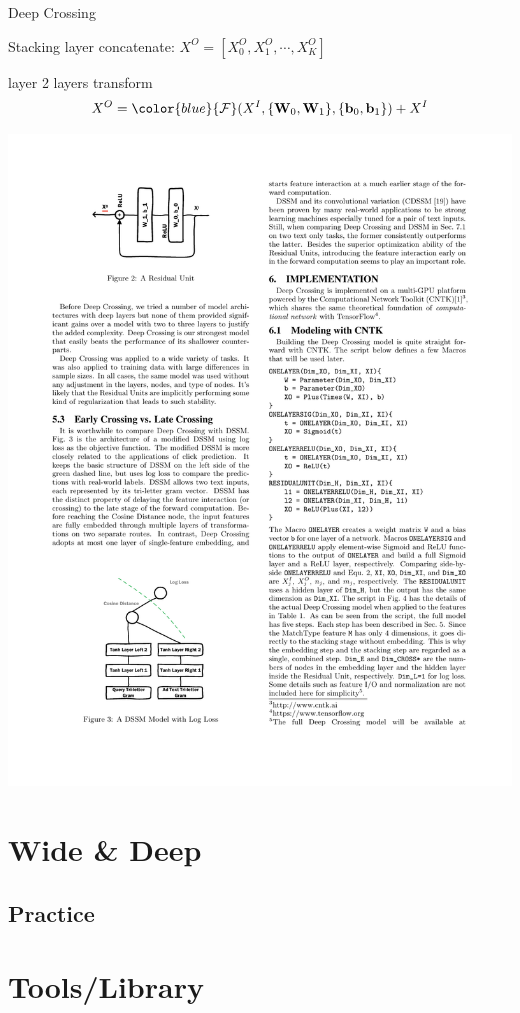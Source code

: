 \documentclass{ctexbeamer}
\begin{document}
\begin{frame}{Deep Crossing}
	\begin{block}{Stacking layer}
		concatenate: $X^O = [X_0^O,X_1^O,\cdots,X_K^O]$
	\end{block}
	\begin{block}{{\color{blue}{Residual}} layer}
		2 layers {\color{blue}{ReLu}} transform
		$$X^O = {\color{blue}{\cal F}}(X^I,\{\mathbf{W}_0,\mathbf{W}_1\},\{\mathbf{b}_0,\mathbf{b}_1\})+X^I$$
    \begin{center}
		\includegraphics[width=.6\textwidth]{res_unit}
	\end{center}
	\end{block}
\end{frame}

\section{Wide \& Deep}
\subsection{Practice}

\section{Tools/Library}
\end{document}
